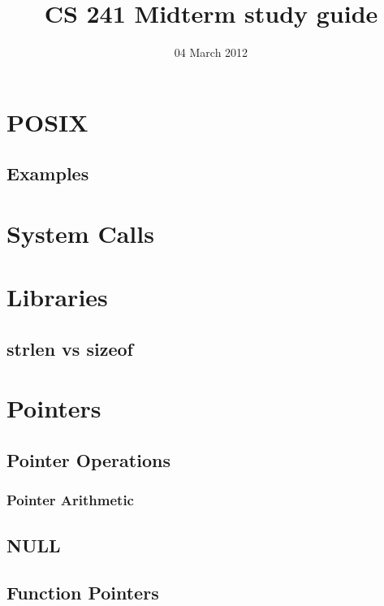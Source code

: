 \documentclass[11pt]{article}
\title{CS 241 Midterm study guide}
\author{}
\date{04 March 2012}
\begin{document}
\maketitle

\setcounter{tocdepth}{3}
\tableofcontents
\vspace*{1cm}
\section{POSIX}
\label{sec-1}

\subsection{Examples}
\label{sec-1.1}

\section{System Calls}
\label{sec-2}

\section{Libraries}
\label{sec-3}

\subsection{strlen vs sizeof}
\label{sec-3.1}

\section{Pointers}
\label{sec-4}

\subsection{Pointer Operations}
\label{sec-4.1}

\subsubsection{Pointer Arithmetic}
\label{sec-4.1.1}

\subsection{NULL}
\label{sec-4.2}

\subsection{Function Pointers}
\label{sec-4.3}
\end{document}
